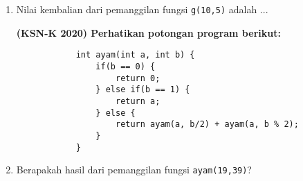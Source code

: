 \documentclass[11pt]{scrartcl}
\begin{document}
\begin{enumerate}
		    \item  Nilai kembalian dari pemanggilan fungsi \verb*|g(10,5)| adalah ...
		    
		    \textbf{(KSN-K 2020) Perhatikan potongan program berikut:}
		    \begin{lstlisting}
		    int ayam(int a, int b) {
		    	if(b == 0) {
		    		return 0;
		    	} else if(b == 1) {
		    		return a;
		    	} else {
		    		return ayam(a, b/2) + ayam(a, b % 2);
		    	}
		    }
		    \end{lstlisting}
		    \item Berapakah hasil dari pemanggilan fungsi \verb*|ayam(19,39)|?
		    
		    \end{enumerate}
\end{document}

